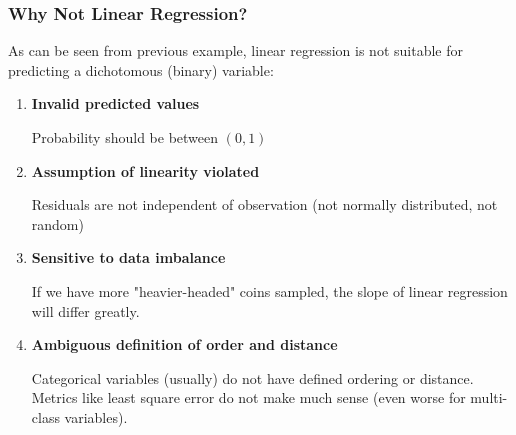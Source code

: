 \documentclass[10pt,aspectratio=169]{beamer}
\begin{document}
\begin{frame}
  \frametitle{Why Not Linear Regression?}
  As can be seen from previous example, linear regression is not
  suitable for predicting a dichotomous (binary) variable:

  \begin{enumerate}
    \vfill \item \textbf{Invalid predicted values}

    Probability should be between $(0, 1)$
  
    \vfill \item \textbf{Assumption of linearity violated}

    Residuals are not independent of observation (not normally
    distributed, not random)

  
    \vfill \item \textbf{Sensitive to data imbalance}

    If we have more "heavier-headed" coins sampled, the slope of
    linear regression will differ greatly.

    
    \vfill \item \textbf{Ambiguous definition of order and distance}

    Categorical variables (usually) do not have defined ordering or
    distance. Metrics like least square error do not make much sense
    (even worse for multi-class variables).
    
  \end{enumerate}
\end{frame}
\end{document}
